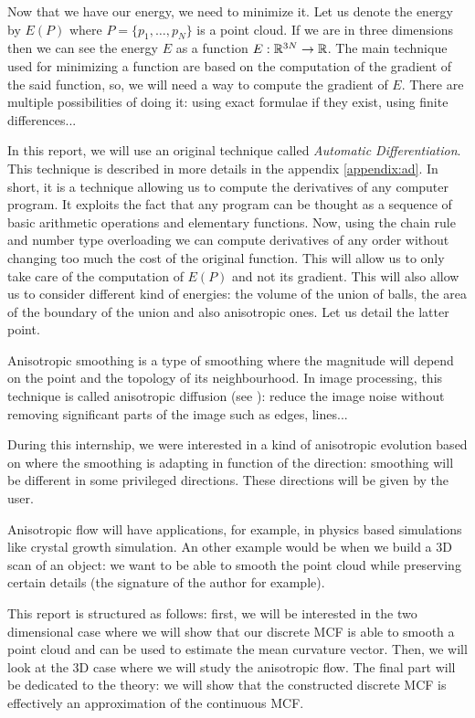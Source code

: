 Now that we have our energy, we need to minimize it. Let us denote the energy by
$ E(P) $ where $ P = \{ p_1, \ldots, p_N \} $ is a point cloud. If we are in
three dimensions then we can see the energy $ E $ as a function $ E : \mathbb{R}^{3N}
\to \mathbb{R} $. The main technique used for minimizing a function are based on the
computation of the gradient of the said function, so, we will need a way to
compute the gradient of $ E $. There are multiple possibilities of doing it:
using exact formulae if they exist, using finite differences...

In this report, we will use an original technique called \textit{Automatic
    Differentiation}. This technique is described in more details in the
appendix \ref{appendix:ad}. In short, it is a technique allowing us to compute
the derivatives of any computer program. It exploits the fact that any program
can be thought as a sequence of basic arithmetic operations and elementary
functions. Now, using the chain rule and number type overloading we can compute
derivatives of any order without changing too much the cost of the original
function.  This will allow us to only take care of the computation of $ E(P) $
and not its gradient. This will also allow us to consider different kind of
energies: the volume of the union of balls, the area of the boundary of the
union and also anisotropic ones. Let us detail the latter point.


Anisotropic smoothing is a type of smoothing where the magnitude will depend on
the point and the topology of its neighbourhood. In image processing, this
technique is called anisotropic diffusion (see \cite{weickert1998anisotropic}):
reduce the image noise without removing significant parts of the image such as
edges, lines...

During this internship, we were interested in a kind of anisotropic evolution
based on \cite{chambolle2012nonlocal} where the smoothing is adapting in
function of the direction: smoothing will be different in some privileged
directions. These directions will be given by the user.

Anisotropic flow will have applications, for example, in physics based
simulations like crystal growth simulation.  An other example would be when we
build a 3D scan of an object: we want to be able to smooth the point cloud while
preserving certain details (the signature of the author for example).

This report is structured as follows: first, we will be interested in the two
dimensional case where we will show that our discrete MCF is able to smooth a
point cloud and can be used to estimate the mean curvature vector. Then, we will
look at the 3D case where we will study the anisotropic flow. The final part
will be dedicated to the theory: we will show that the constructed discrete MCF
is effectively an approximation of the continuous MCF.



